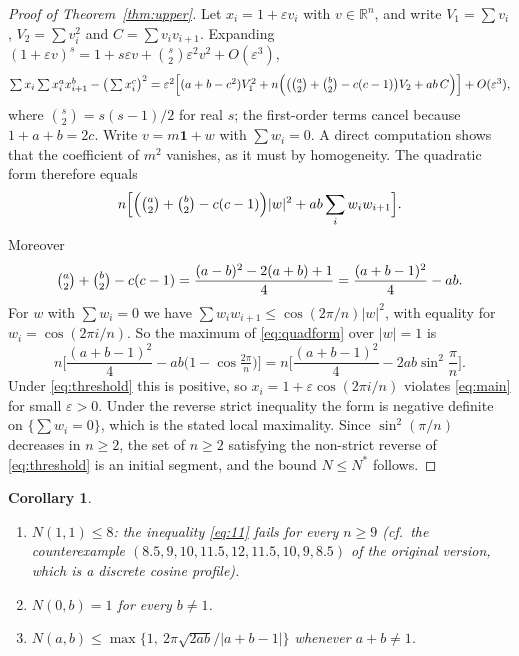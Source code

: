 \documentclass[11pt]{article}
\newtheorem{corollary}[theorem]{Corollary}
\theoremstyle{remark}
\numberwithin{equation}{section}
\newcommand{\R}{\mathbb{R}}
\begin{document}
\begin{proof}[Proof of Theorem~\ref{thm:upper}]
Let $x_i=1+\varepsilon v_i$ with $v\in\R^n$, and write $V_1=\sum v_i$, $V_2=\sum v_i^2$ and
$C=\sum v_iv_{i+1}$. Expanding $(1+\varepsilon v)^s=1+s\varepsilon v+\binom s2\varepsilon^2v^2+O(\varepsilon^3)$,
\begin{align*}
\textstyle\sum x_i\sum x_i^ax_{i+1}^b-\big(\sum x_i^c\big)^2
=\varepsilon^2\Big[(a+b-c^2)V_1^2+n\Big(\big(\tbinom a2+\tbinom b2-c(c-1)\big)V_2+ab\,C\Big)\Big]+O(\varepsilon^3),
\end{align*}
where $\binom s2=s(s-1)/2$ for real $s$;
the first-order terms cancel because $1+a+b=2c$. Write $v=m\mathbf 1+w$ with $\sum w_i=0$.
A direct computation shows that the coefficient of $m^2$ vanishes, as it must by homogeneity.
The quadratic form therefore equals
\begin{equation}\label{eq:quadform}
n\Big[\Big(\tbinom a2+\tbinom b2-c(c-1)\Big)|w|^2+ab\sum_i w_iw_{i+1}\Big].
\end{equation}
Moreover
\[
\tbinom a2+\tbinom b2-c(c-1)=\frac{(a-b)^2-2(a+b)+1}{4}=\frac{(a+b-1)^2}{4}-ab .
\]
For $w$ with $\sum w_i=0$ we have $\sum w_iw_{i+1}\le\cos(2\pi/n)|w|^2$, with equality for
$w_i=\cos(2\pi i/n)$. So the maximum of \eqref{eq:quadform} over $|w|=1$ is
\[
n\Big[\frac{(a+b-1)^2}{4}-ab\big(1-\cos\tfrac{2\pi}{n}\big)\Big]=n\Big[\frac{(a+b-1)^2}{4}-2ab\sin^2\frac{\pi}{n}\Big].
\]
Under \eqref{eq:threshold} this is positive, so $x_i=1+\varepsilon\cos(2\pi i/n)$ violates
\eqref{eq:main} for small $\varepsilon>0$. Under the reverse strict inequality the form is negative
definite on $\{\sum w_i=0\}$, which is the stated local maximality. Since
$\sin^2(\pi/n)$ decreases in $n\ge2$, the set of $n\ge2$ satisfying the non-strict reverse of
\eqref{eq:threshold} is an initial segment, and the bound $N\le N^*$ follows.
\end{proof}

\begin{corollary}\label{cor:examples}
\begin{enumerate}[label=(\roman*)]
\item $N(1,1)\le 8$: the inequality \eqref{eq:11} fails for every $n\ge 9$ (cf.\ the
counterexample $(8.5,9,10,11.5,12,11.5,10,9,8.5)$ of the original version, which is a discrete
cosine profile).
\item $N(0,b)=1$ for every $b\ne1$.
\item $N(a,b)\le\max\big\{1,\ 2\pi\sqrt{2ab}/|a+b-1|\big\}$ whenever $a+b\neq 1$.
\end{enumerate}
\end{corollary}
\end{document}
